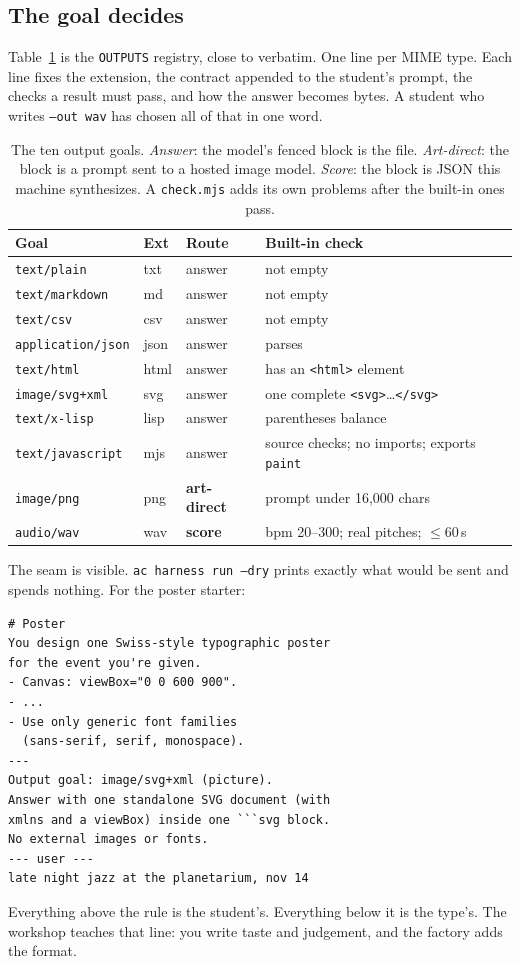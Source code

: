 \documentclass[10pt,letterpaper,twocolumn]{article}
\newcommand{\code}[1]{\texttt{#1}}
\begin{document}
\subsection{The goal decides}
Table~\ref{tab:goals} is the \code{OUTPUTS} registry, close to verbatim. One
line per MIME type. Each line fixes the extension, the contract appended to
the student's prompt, the checks a result must pass, and how the answer
becomes bytes. A student who writes \code{--out wav} has chosen all of that
in one word.

\begin{table}[t]
\centering
\footnotesize
\setlength{\tabcolsep}{3pt}
\begin{tabularx}{\columnwidth}{@{}l l l X@{}}
\toprule
Goal & Ext & Route & Built-in check \\
\midrule
\code{text/plain} & txt & answer & not empty \\
\code{text/markdown} & md & answer & not empty \\
\code{text/csv} & csv & answer & not empty \\
\code{application/json} & json & answer & parses \\
\code{text/html} & html & answer & has an \code{<html>} element \\
\code{image/svg+xml} & svg & answer & one complete \code{<svg>}…\code{</svg>} \\
\code{text/x-lisp} & lisp & answer & parentheses balance \\
\code{text/javascript} & mjs & answer & source checks; no imports; exports \code{paint} \\
\code{image/png} & png & \textbf{art-direct} & prompt under 16{,}000 chars \\
\code{audio/wav} & wav & \textbf{score} & bpm 20--300; real pitches; $\le$60\,s \\
\bottomrule
\end{tabularx}
\caption{The ten output goals. \emph{Answer}: the model's fenced block
is the file. \emph{Art-direct}: the block is a prompt sent to a hosted image
model. \emph{Score}: the block is JSON this machine synthesizes. A
\code{check.mjs} adds its own problems after the built-in ones pass.}
\label{tab:goals}
\end{table}

The seam is visible. \code{ac harness run --dry} prints exactly what would
be sent and spends nothing. For the poster starter:
\begin{Verbatim}
# Poster
You design one Swiss-style typographic poster
for the event you're given.
- Canvas: viewBox="0 0 600 900".
- ...
- Use only generic font families
  (sans-serif, serif, monospace).
---
Output goal: image/svg+xml (picture).
Answer with one standalone SVG document (with
xmlns and a viewBox) inside one ```svg block.
No external images or fonts.
--- user ---
late night jazz at the planetarium, nov 14
\end{Verbatim}
Everything above the rule is the student's. Everything below it is the
type's. The workshop teaches that line: you write taste and judgement, and
the factory adds the format.
\end{document}
